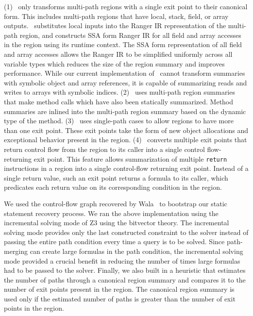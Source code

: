 (1) \tool\ only transforms multi-path regions with a single exit point to their canonical form.
This includes multi-path regions that have local, stack, field, or array outputs.
%
\tool\ substitutes local inputs into the Ranger IR representation of the multi-path region, and constructs SSA form
Ranger IR for all field and array accesses in the region using its runtime context.
%
The SSA form representation of all field and array accesses allows the Ranger IR to be simplified uniformly across all
variable types which reduces the size of the region summary and improves performance.
%
While our current implementation of \tool\ cannot transform summaries with symbolic object and array
references, it is capable of summarizing reads and writes to arrays with symbolic indices.
%
(2) \tool\ uses multi-path region
summaries that make method calls which have also been statically summarized.
%
Method summaries are inlined into
the multi-path region summary based on the dynamic type of the method.
%
(3) \tool\ uses single-path cases to allow regions to have more than one exit point.
%
These exit points take the form of new object allocations and exceptional behavior present in the region.
%
(4) \tool\ converts multiple exit points that return
control flow from the region to its caller into a single control flow-returning exit point.
%
This feature allows summarization of multiple {\tt return} instructions in a region into a single control-flow
returning exit point.
%
Instead of a single return value, such an exit point returns a formula to its caller, which predicates
each return value on its corresponding condition in the region.

We used the control-flow graph recovered by Wala~\cite{Wala} to bootstrap our static statement recovery process.
%
%
%
We ran the above implementation using the incremental solving mode of Z3 using the bitvector theory.
%
The incremental solving mode provides only the last constructed constraint to the solver instead of passing the entire
path condition every time a query is to be solved.
%
Since path-merging can create large formulas in the path condition, the incremental solving mode provided a crucial
benefit in reducing the number of times large formulas had to be passed to the solver.
%
Finally, we also built in a heuristic that estimates the number of paths through a canonical region summary and compares
it to the number of exit points present in the region.
%
The canonical region summary is used only if the estimated number of paths is greater than the number of exit points in
the region.
%
